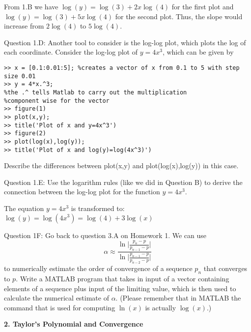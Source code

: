 \documentclass{article}
\def\ds{\displaystyle}
\begin{document}
{\color{teal} From 1.B we have $\log(y) = \log (3) + 2x \log(4)$ for the first plot and $\log(y) = \log (3) + 5x \log(4)$ for the second plot. Thus, the slope would increase from $2 \log(4)$ to $5\log(4)$. } \medskip \par \noindent
%
Question 1.D: Another tool to consider is the log-log plot, which plots the log of each coordinate. Consider the log-log plot of $\ds y = 4x^3$, which can be given by
\begin{verbatim}
>> x = [0.1:0.01:5]; %creates a vector of x from 0.1 to 5 with step size 0.01
>> y = 4*x.^3; 
%the .^ tells Matlab to carry out the multiplication 
%component wise for the vector
>> figure(1)
>> plot(x,y);
>> title('Plot of x and y=4x^3')
>> figure(2)
>> plot(log(x),log(y));
>> title('Plot of x and log(y)=log(4x^3)')    
\end{verbatim}
\par
Describe the differences between plot(x,y) and plot(log(x),log(y)) in this case. 
\medskip \par \noindent
%
Question 1.E: Use the logarithm rules (like we did in Question B) to derive the connection between the log-log plot for the function $\ds y=4x^3$.

{\color{teal} The equation $\ds y = 4x^3$ is transformed to: $\ds \log(y) = \log(4x^3) = \log(4) + 3\log(x)$}
\medskip \par \noindent
%
Question 1F: Go back to question 3.A on Homework 1. We can use 
$$\alpha \approx \frac {\ln \biggr \vert \frac {p_n-p}{p_{n-1}-p}\biggr \vert}{\ln \biggr \vert \frac {p_{n-1}-p}{p_{n-2}-p}\biggr \vert}$$
to numerically estimate the order of convergence of a sequence $\ds p_n$ that converges to $p$. Write a MATLAB program that takes in input of a vector containing elements of a sequence plus input of the limiting value, which is then used to calculate the numerical estimate of $\alpha$. (Please remember that in MATLAB the command that is used for computing $\ln(x)$ is actually $\log(x)$.)
\par \bigskip \par
{\bf 2. Taylor's Polynomial and Convergence} \\
\end{document}
